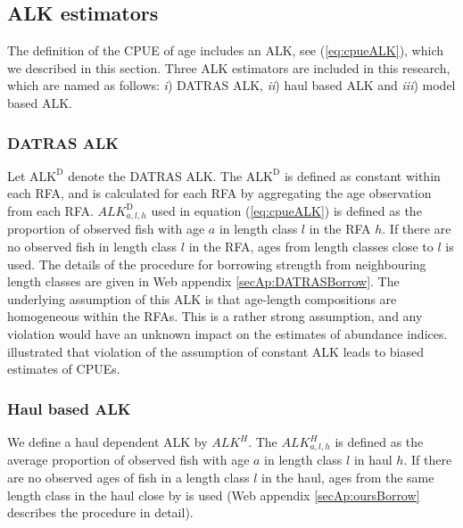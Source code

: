 \documentclass[a4paper 12pt]{article}
\numberwithin{equation}{section}
\begin{document}
 

\subsection{ALK estimators}

The definition of the CPUE of age includes an ALK, see (\ref{eq:cpueALK}), which we described in this section. Three ALK estimators are included in this research, which are named as follows:  \textit{i}) DATRAS ALK, \textit{ii}) haul based ALK and \textit{iii}) model based ALK.
\subsubsection{DATRAS ALK}
\label{sec:datrasalkestimator}
Let $\text{ALK}^{\text{D}}$ denote the DATRAS ALK. The $\text{ALK}^{\text{D}}$ is defined as constant within each RFA, and is calculated for each RFA by aggregating the age observation from each RFA. $ALK^{\text{D}}_{a,l,h}$ used in equation (\ref{eq:cpueALK}) is defined as the proportion of observed fish with age $a$ in length class $l$ in the RFA $h$. If there are no observed fish in length class $l$ in the RFA, ages from length classes close to $l$ is used. The details of the procedure for borrowing strength from neighbouring length classes are given in Web appendix \ref{secAp:DATRASBorrow}. The underlying assumption of this ALK  is that age-length compositions are homogeneous within the RFAs. This is a rather strong assumption, and any violation would have an unknown impact on the estimates of abundance indices. \citet{aanes2015efficient} illustrated that violation of the assumption of constant ALK leads to biased estimates of CPUEs. 

\subsubsection{Haul based ALK}
\label{sec:haulestimator}
We define a haul dependent ALK  by  $ALK^{H}$. The $ALK^{H}_{a,l,h}$ is defined as the average proportion of observed fish with age $a$ in  length class $l$ in haul $h$. If there are no observed ages of fish in a length class $l$ in the haul, ages from the same length class in the haul close by is used (Web appendix \ref{secAp:oursBorrow} describes the procedure in detail).
\end{document}
